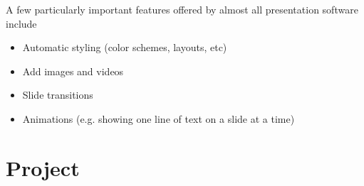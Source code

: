 A few particularly important features offered by almost all presentation software include
\begin{itemize}
	\item Automatic styling (color schemes, layouts, etc) 
	\item Add images and videos
	\item Slide transitions 
	\item Animations (e.g. showing one line of text on a slide at a time) 
\end{itemize}

\section{Project} 

